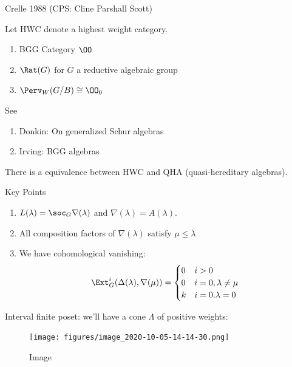 Crelle 1988 (CPS: Cline Parshall Scott)

Let HWC denote a highest weight category.

\begin{example}

\begin{enumerate}
\def\labelenumi{\arabic{enumi}.}
\item
  BGG Category \(\OO\)
\item
  \(\Rat(G)\) for \(G\) a reductive algebraic group
\item
  \(\Perv_W(G/B) \cong \OO_0\)
\end{enumerate}

\end{example}

See

\begin{enumerate}
\def\labelenumi{\arabic{enumi}.}
\item
  Donkin: On generalized Schur algebras
\item
  Irving: BGG algebras
\end{enumerate}

There is a equivalence between HWC and QHA (quasi-hereditary algebras).

\begin{remark}

Key Points

\begin{enumerate}
\def\labelenumi{\arabic{enumi}.}
\item
  \(L(\lambda) = \soc_G \nabla(\lambda)\) and
  \(\nabla(\lambda) = A(\lambda)\).
\item
  All composition factors of \(\nabla(\lambda)\) satisfy
  \(\mu \leq \lambda\)
\item
  We have cohomological vanishing:
  \begin{align*}
  \Ext_G^i(\Delta(\lambda), \nabla(\mu)) = 
  \begin{cases}
  0 & i >0 \\
  0 & i=0, \lambda \neq \mu \\
  k & i=0. \lambda = 0
  \end{cases}
  \end{align*}
\end{enumerate}

\end{remark}

Interval finite poset: we'll have a cone \(\Lambda\) of positive
weights:

\begin{figure}
\centering
\texttt{[image: figures/image\_2020-10-05-14-14-30.png]}
\caption{Image}
\end{figure}

